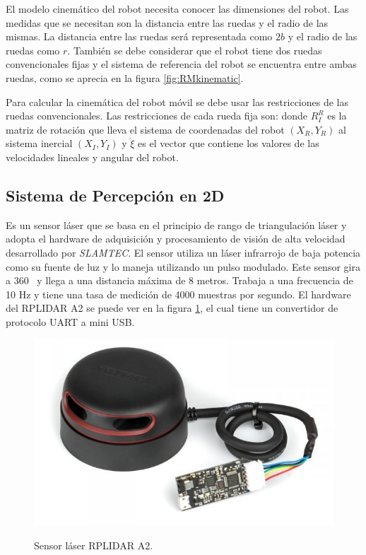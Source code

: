 El modelo cinem\'atico del robot necesita conocer las dimensiones del robot. Las 
medidas que se necesitan son la distancia entre las ruedas y el radio de las 
mismas. La distancia entre las ruedas ser\'a representada como $2b$ y el radio de 
las ruedas como $r$. Tambi\'en se debe considerar que el robot tiene dos ruedas 
convencionales fijas y el sistema de referencia del robot se encuentra entre 
ambas ruedas, como se aprecia en la figura \ref{fig:RMkinematic}.

Para calcular la cinem\'atica del robot m\'ovil se debe usar las restricciones 
de las ruedas convencionales. Las restricciones de cada rueda fija son:
donde ${R}^R_{I}$ es la matriz de rotaci\'on que lleva el sistema de coordenadas del 
robot $(X_{R},Y_{R})$ al sistema inercial $(X_{I},Y_{I})$ y $\dot{\xi}$ 
es el vector que contiene los valores de las velocidades lineales y angular 
del robot.


\subsection{Sistema de Percepci\'on en 2D}
Es un sensor l\'aser que se basa en el  principio de rango de triangulaci\'on 
láser \cite{amann2001laser} y adopta el hardware de adquisici\'on y 
procesamiento de visi\'on de alta velocidad desarrollado por \textit{SLAMTEC}. El 
sensor utiliza un l\'aser infrarrojo de baja potencia como su fuente de luz y lo 
maneja utilizando un pulso modulado. Este sensor gira a 360 \grad ~y llega a 
una distancia m\'axima de 8 metros. Trabaja a una frecuencia de 10 Hz y 
tiene una tasa de medici\'on de 4000 muestras por segundo. El hardware del 
RPLIDAR A2 se puede ver en la figura \ref{f:lidar}, el cual tiene un 
convertidor de protocolo UART a mini USB.
\begin{figure}%
\centering \footnotesize
 {\includegraphics[width=0.60\linewidth]{images/rplidar.JPG}}
 \captionsetup{font=footnotesize}
 \caption{Sensor láser RPLIDAR A2.}
 \label{f:lidar}
\end{figure}

